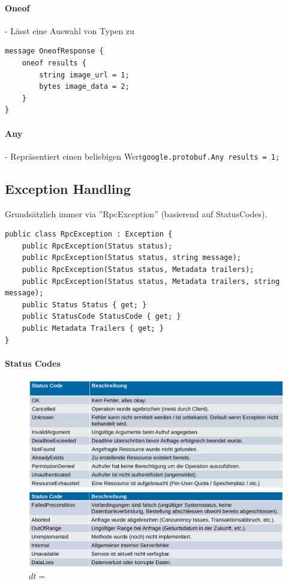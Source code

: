 \documentclass[
a4paper,
oneside,
10pt,
fleqn,
headsepline,
toc=listofnumbered, 
bibliography=totocnumbered]{scrartcl}
\begin{document}
\paragraph{Oneof} - Lässt eine Auswahl von Typen zu
\begin{lstlisting}
message OneofResponse {
    oneof results {
        string image_url = 1;
        bytes image_data = 2;
    }
}
\end{lstlisting}
\paragraph{Any} - Repräsentiert einen beliebigen Wert\lstinline{google.protobuf.Any results = 1;}

\subsection{Exception Handling}
Grundsätzlich immer via ''RpcException'' (basierend auf StatusCodes).
\begin{lstlisting}
public class RpcException : Exception {
    public RpcException(Status status);
    public RpcException(Status status, string message);
    public RpcException(Status status, Metadata trailers);
    public RpcException(Status status, Metadata trailers, string message);
    public Status Status { get; }
    public StatusCode StatusCode { get; }
    public Metadata Trailers { get; }
}
\end{lstlisting}
\paragraph{Status Codes} \hfill
\begin{figure}[!ht]
	\centering
	\begin{minipage}{.5\textwidth}
		\centering
		\includegraphics[width=0.49\linewidth]{images/grpc_status_codes_1.png}
		\caption{$dt=0.1$}
	\end{minipage}%
	\begin{minipage}{0.5\textwidth}
		\centering
		\includegraphics[width=0.49\linewidth]{images/grpc_status_codes_2.png}
		\caption{$dt =$}
	\end{minipage}
\end{figure}
\end{document}
